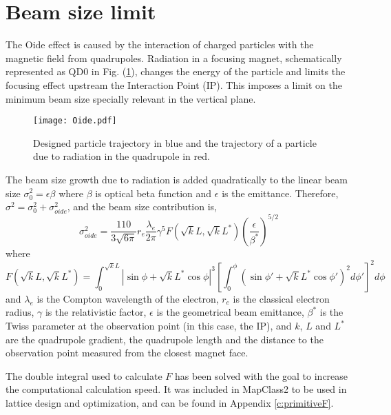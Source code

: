 \section{Beam size limit}\label{Oideeffect}
The Oide effect is caused by the interaction of charged particles with the magnetic field from quadrupoles. Radiation in a focusing magnet, schematically represented as QD0 in Fig. (\ref{f:Oideeffect}), changes the energy of the particle and limits the focusing effect upstream the Interaction Point (IP). This imposes a limit on the minimum beam size specially relevant in the vertical plane.\par%
\begin{figure}[!hbt]
\texttt{[image: Oide.pdf]}
\centering
\caption{Designed particle trajectory in blue and the trajectory of a particle due to radiation in the quadrupole in red.}\label{f:Oideeffect}
\end{figure}
 The beam size growth due to radiation is added quadratically to the linear beam size $\sigma_0^2=\epsilon\beta$ where $\beta$ is optical beta function and $\epsilon$ is the emittance. Therefore, $ \sigma^2 = \sigma_0^2 + \sigma_{oide}^2$, and the beam size contribution is,
 \begin{equation}
  \sigma^2_{oide} = \frac{110}{3\sqrt{6\pi}}r_e\frac{\lambda_e}{2\pi}\gamma^5 F(\sqrt{k}L,\sqrt{k}L^*)\left(\frac{\epsilon}{\beta^*}\right)^{5/2}
  \label{Oideequ}
 \end{equation}
 where
 \begin{equation}
  F(\sqrt{k}L, \sqrt{k}L^*) = \int_0^{\sqrt{k}L}|\sin\phi+\sqrt{k}L^*\cos\phi|^3\left[\int_0^\phi(\sin\phi'+\sqrt{k}L^*\cos\phi')^2 d\phi'\right]^2d\phi
  \label{OideF}
 \end{equation}
  and $\lambda_e$ is the Compton wavelength of the electron, $r_e$ is the classical electron radius, $\gamma$ is the relativistic factor, $\epsilon$ is the geometrical beam emittance, $\beta^*$ is the Twiss parameter at the observation point (in this case, the IP), and $k$, $L$ and $L^*$ are the quadrupole gradient, the quadrupole length and the distance to the observation point measured from the closest magnet face.\par
  The double integral used to calculate $F$ has been solved with the goal to increase the computational calculation speed. It was included in MapClass2\cite{Mapclassorig,Mapclass,Mapclass2,githubMapClass2} to be used in lattice design and optimization, and can be found in Appendix \ref{c:primitiveF}.\par
